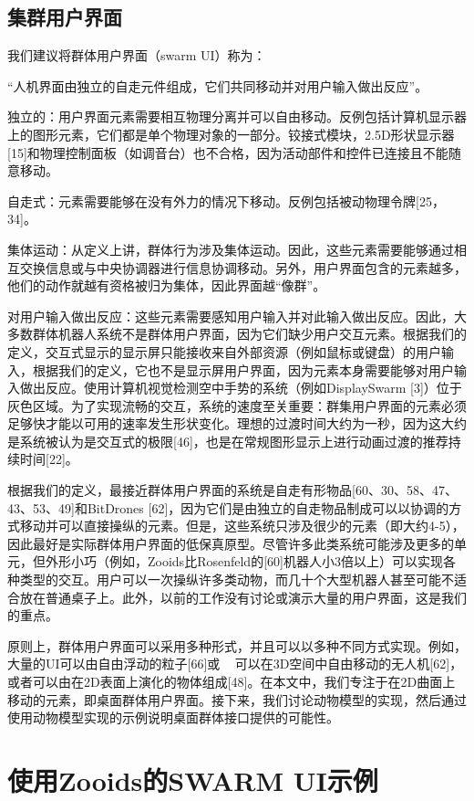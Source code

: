 \subsection{集群用户界面}

我们建议将群体用户界面（swarm UI）称为：

“人机界面由独立的自走元件组成，它们共同移动并对用户输入做出反应”。

独立的：用户界面元素需要相互物理分离并可以自由移动。反例包括计算机显示器上的图形元素，它们都是单个物理对象的一部分。铰接式模块，2.5D形状显示器[15]和物理控制面板（如调音台）也不合格，因为活动部件和控件已连接且不能随意移动。

自走式：元素需要能够在没有外力的情况下移动。反例包括被动物理令牌[25，34]。

集体运动：从定义上讲，群体行为涉及集体运动。因此，这些元素需要能够通过相互交换信息或与中央协调器进行信息协调移动。另外，用户界面包含的元素越多，他们的动作就越有资格被归为集体，因此界面越“像群”。

对用户输入做出反应：这些元素需要感知用户输入并对此输入做出反应。因此，大多数群体机器人系统不是群体用户界面，因为它们缺少用户交互元素。根据我们的定义，交互式显示的显示屏只能接收来自外部资源（例如鼠标或键盘）的用户输入，根据我们的定义，它也不是显示屏用户界面，因为元素本身需要能够对用户输入做出反应。使用计算机视觉检测空中手势的系统（例如DisplaySwarm [3]）位于灰色区域。为了实现流畅的交互，系统的速度至关重要：群集用户界面的元素必须足够快才能以可用的速率发生形状变化。理想的过渡时间大约为一秒，因为这大约是系统被认为是交互式的极限[46]，也是在常规图形显示上进行动画过渡的推荐持续时间[22]。

根据我们的定义，最接近群体用户界面的系统是自走有形物品[60、30、58、47、43、53、49]和BitDrones [62]，因为它们是由独立的自走物品制成可以以协调的方式移动并可以直接操纵的元素。但是，这些系统只涉及很少的元素（即大约4-5），因此最好是实际群体用户界面的低保真原型。尽管许多此类系统可能涉及更多的单元，但外形小巧（例如，Zooids比Rosenfeld的[60]机器人小3倍以上）可以实现各种类型的交互。用户可以一次操纵许多类动物，而几十个大型机器人甚至可能不适合放在普通桌子上。此外，以前的工作没有讨论或演示大量的用户界面，这是我们的重点。

原则上，群体用户界面可以采用多种形式，并且可以以多种不同方式实现。例如，大量的UI可以由自由浮动的粒子[66]或
 
可以在3D空间中自由移动的无人机[62]，或者可以由在2D表面上演化的物体组成[48]。在本文中，我们专注于在2D曲面上移动的元素，即桌面群体用户界面。接下来，我们讨论动物模型的实现，然后通过使用动物模型实现的示例说明桌面群体接口提供的可能性。

\section{使用Zooids的SWARM UI示例}

